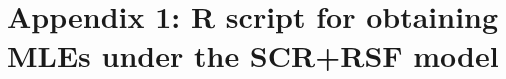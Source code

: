 \section*{Appendix 1: {\bf R} script for obtaining MLEs under the SCR+RSF model}






















